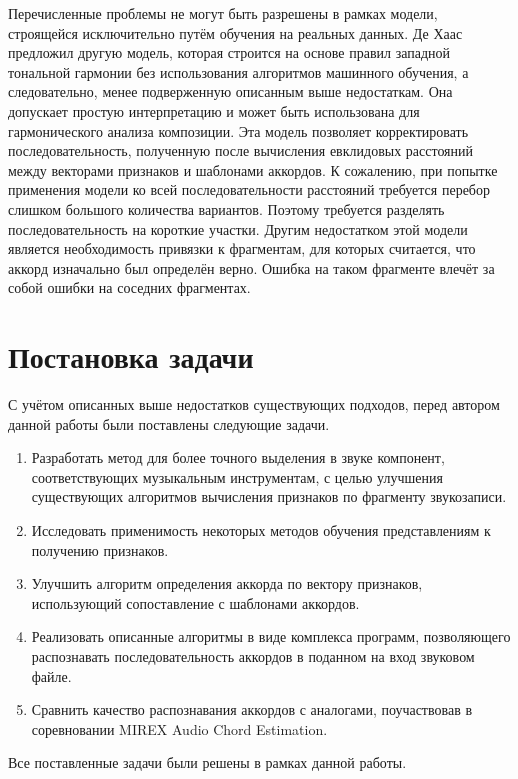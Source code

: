 Перечисленные проблемы не могут быть разрешены в рамках модели, строящейся
исключительно путём обучения на реальных данных. Де Хаас предложил другую
модель, которая строится на основе правил западной тональной гармонии без
использования алгоритмов машинного обучения, а следовательно, менее подверженную
описанным выше недостаткам. Она допускает простую интерпретацию и может быть
использована для гармонического анализа композиции. Эта модель позволяет
корректировать последовательность, полученную после вычисления евклидовых
расстояний между векторами признаков и шаблонами аккордов. К сожалению, при
попытке применения модели ко всей последовательности расстояний требуется
перебор слишком большого количества вариантов. Поэтому требуется разделять
последовательность на короткие участки. Другим недостатком этой модели является
необходимость привязки к фрагментам, для которых считается, что аккорд
изначально был определён верно. Ошибка на таком фрагменте влечёт за собой ошибки
на соседних фрагментах.

\section{Постановка задачи}

С учётом описанных выше недостатков существующих подходов, перед автором данной
работы были поставлены следующие задачи.

\begin{enumerate}
  \item Разработать метод для более точного выделения в звуке компонент,
  соответствующих музыкальным инструментам, с целью улучшения существующих
  алгоритмов вычисления признаков по фрагменту звукозаписи.
  \item Исследовать применимость некоторых методов обучения представлениям к
  получению признаков.
  \item Улучшить алгоритм определения аккорда по вектору признаков,
  использующий сопоставление с шаблонами аккордов.
  \item Реализовать описанные алгоритмы в виде комплекса программ, позволяющего
  распознавать последовательность аккордов в поданном на вход звуковом файле.
  \item Сравнить качество распознавания аккордов с аналогами, поучаствовав в
  соревновании MIREX Audio Chord Estimation.
\end{enumerate}

Все поставленные задачи были решены в рамках данной работы.

